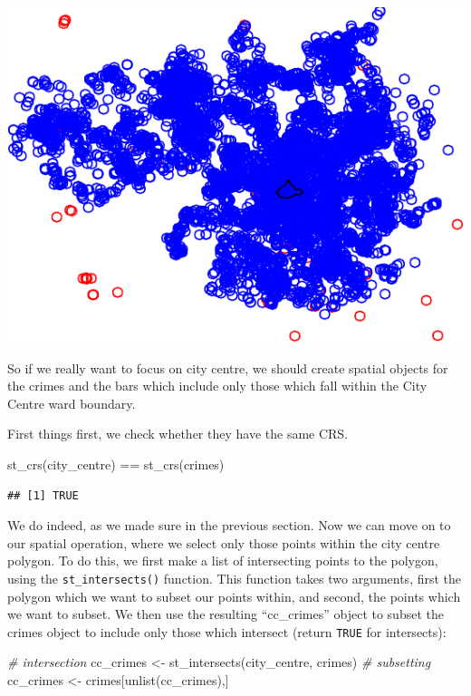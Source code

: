 \documentclass[
]{book}
\newenvironment{Shaded}{\begin{snugshade}}{\end{snugshade}}
\newcommand{\CommentTok}[1]{\textcolor[rgb]{0.56,0.35,0.01}{\textit{#1}}}
\newcommand{\FunctionTok}[1]{\textcolor[rgb]{0.00,0.00,0.00}{#1}}
\newcommand{\NormalTok}[1]{#1}
\newcommand{\OtherTok}[1]{\textcolor[rgb]{0.56,0.35,0.01}{#1}}
\newcommand{\SpecialCharTok}[1]{\textcolor[rgb]{0.00,0.00,0.00}{#1}}
\begin{document}
\includegraphics{crime_mapping_files/figure-latex/plot_crimes-1.pdf}

So if we really want to focus on city centre, we should create spatial objects for the crimes and the bars which include only those which fall within the City Centre ward boundary.

First things first, we check whether they have the same CRS.

\begin{Shaded}
\begin{Highlighting}[]
\FunctionTok{st\_crs}\NormalTok{(city\_centre) }\SpecialCharTok{==} \FunctionTok{st\_crs}\NormalTok{(crimes)}
\end{Highlighting}
\end{Shaded}

\begin{verbatim}
## [1] TRUE
\end{verbatim}

We do indeed, as we made sure in the previous section. Now we can move on to our spatial operation, where we select only those points within the city centre polygon. To do this, we first make a list of intersecting points to the polygon, using the \texttt{st\_intersects()} function. This function takes two arguments, first the polygon which we want to subset our points within, and second, the points which we want to subset. We then use the resulting ``cc\_crimes'' object to subset the crimes object to include only those which intersect (return \texttt{TRUE} for intersects):

\begin{Shaded}
\begin{Highlighting}[]
\CommentTok{\# intersection}
\NormalTok{cc\_crimes }\OtherTok{\textless{}{-}} \FunctionTok{st\_intersects}\NormalTok{(city\_centre, crimes)}
\CommentTok{\# subsetting}
\NormalTok{cc\_crimes }\OtherTok{\textless{}{-}}\NormalTok{ crimes[}\FunctionTok{unlist}\NormalTok{(cc\_crimes),]}
\end{Highlighting}
\end{Shaded}
\end{document}
